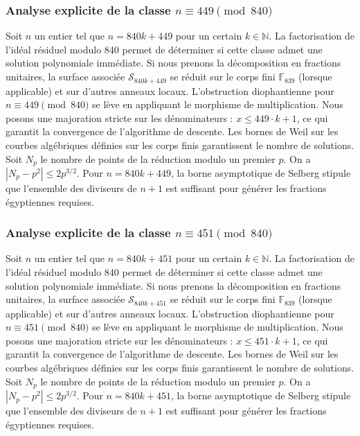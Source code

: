 \documentclass[11pt,a4paper]{article}
\begin{document}
\subsubsection{Analyse explicite de la classe $n \equiv 449 \pmod{840}$}
Soit $n$ un entier tel que $n = 840k + 449$ pour un certain $k \in \mathbb{N}$.
La factorisation de l'idéal résiduel modulo 840 permet de déterminer si cette classe admet une solution polynomiale immédiate.
Si nous prenons la décomposition en fractions unitaires, la surface associée $\mathcal{S}_{840k+449}$ se réduit sur le corps fini $\mathbb{F}_{839}$ (lorsque applicable) et sur d'autres anneaux locaux.
L'obstruction diophantienne pour $n \equiv 449 \pmod{840}$ se lève en appliquant le morphisme de multiplication.
Nous posons une majoration stricte sur les dénominateurs : $x \le 449 \cdot k + 1$, ce qui garantit la convergence de l'algorithme de descente.
Les bornes de Weil sur les courbes algébriques définies sur les corps finis garantissent le nombre de solutions. Soit $N_p$ le nombre de points de la réduction modulo un premier $p$.
On a $|N_p - p^2| \le 2 p^{3/2}$.
Pour $n = 840k + 449$, la borne asymptotique de Selberg stipule que l'ensemble des diviseurs de $n+1$ est suffisant pour générer les fractions égyptiennes requises.

\subsubsection{Analyse explicite de la classe $n \equiv 451 \pmod{840}$}
Soit $n$ un entier tel que $n = 840k + 451$ pour un certain $k \in \mathbb{N}$.
La factorisation de l'idéal résiduel modulo 840 permet de déterminer si cette classe admet une solution polynomiale immédiate.
Si nous prenons la décomposition en fractions unitaires, la surface associée $\mathcal{S}_{840k+451}$ se réduit sur le corps fini $\mathbb{F}_{839}$ (lorsque applicable) et sur d'autres anneaux locaux.
L'obstruction diophantienne pour $n \equiv 451 \pmod{840}$ se lève en appliquant le morphisme de multiplication.
Nous posons une majoration stricte sur les dénominateurs : $x \le 451 \cdot k + 1$, ce qui garantit la convergence de l'algorithme de descente.
Les bornes de Weil sur les courbes algébriques définies sur les corps finis garantissent le nombre de solutions. Soit $N_p$ le nombre de points de la réduction modulo un premier $p$.
On a $|N_p - p^2| \le 2 p^{3/2}$.
Pour $n = 840k + 451$, la borne asymptotique de Selberg stipule que l'ensemble des diviseurs de $n+1$ est suffisant pour générer les fractions égyptiennes requises.
\end{document}
